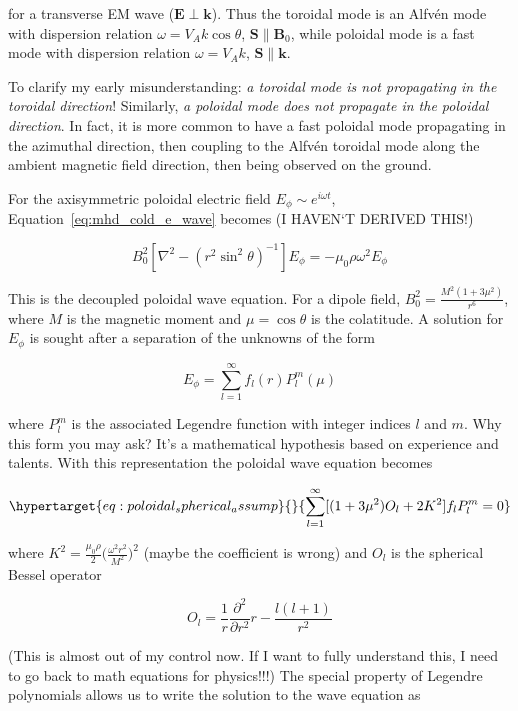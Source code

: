 \documentclass[
  notoc %
]{tufte-book}
\begin{document}
for a transverse EM wave (\(\mathbf{E}\perp\mathbf{k}\)). Thus the
toroidal mode is an Alfvén mode with dispersion relation
\(\omega = V_A k \cos\theta\), \(\mathbf{S} \parallel \mathbf{B}_0\),
while poloidal mode is a fast mode with dispersion relation
\(\omega = V_A k\), \(\mathbf{S} \parallel \mathbf{k}\).

To clarify my early misunderstanding: \emph{a toroidal mode is not
propagating in the toroidal direction}! Similarly, \emph{a poloidal mode
does not propagate in the poloidal direction}. In fact, it is more
common to have a fast poloidal mode propagating in the azimuthal
direction, then coupling to the Alfvén toroidal mode along the ambient
magnetic field direction, then being observed on the ground.

For the axisymmetric poloidal electric field
\(E_\phi \sim e^{i\omega t}\), Equation~\ref{eq:mhd_cold_e_wave} becomes
(I HAVEN`T DERIVED THIS!)

\[
B_0^2[\nabla^2 - (r^2 \sin^2\theta)^{-1}] E_\phi = -\mu_0 \rho \omega^2 E_\phi
\]

This is the decoupled poloidal wave equation. For a dipole field,
\(B_0^2 = \frac{M^2(1+3\mu^2)}{r^6}\), where \(M\) is the magnetic
moment and \(\mu = \cos\theta\) is the colatitude. A solution for
\(E_\phi\) is sought after a separation of the unknowns of the form

\[
E_\phi = \sum_{l=1}^{\infty} f_l(r) P_l^m(\mu)
\]

where \(P_l^m\) is the associated Legendre function with integer indices
\(l\) and \(m\). Why this form you may ask? It's a mathematical
hypothesis based on experience and talents. With this representation the
poloidal wave equation becomes

\begin{equation}\protect\hypertarget{eq:poloidal_spherical_assump}{}{
\sum_{l=1}^{\infty}[(1+3\mu^2)O_l + 2K^2] f_l P_l^m = 0
}\label{eq:poloidal_spherical_assump}\end{equation}

where
\(K^2 = \frac{\mu_0 \rho}{2}\big( \frac{\omega^2 r^2}{M^2}\big)^2\)
(maybe the coefficient is wrong) and \(O_l\) is the spherical Bessel
operator

\[
O_l = \frac{1}{r}\frac{\partial^2}{\partial r^2}r - \frac{l(l+1)}{r^2}
\]

(This is almost out of my control now. If I want to fully understand
this, I need to go back to math equations for physics!!!) The special
property of Legendre polynomials allows us to write the solution to the
wave equation as
\end{document}
